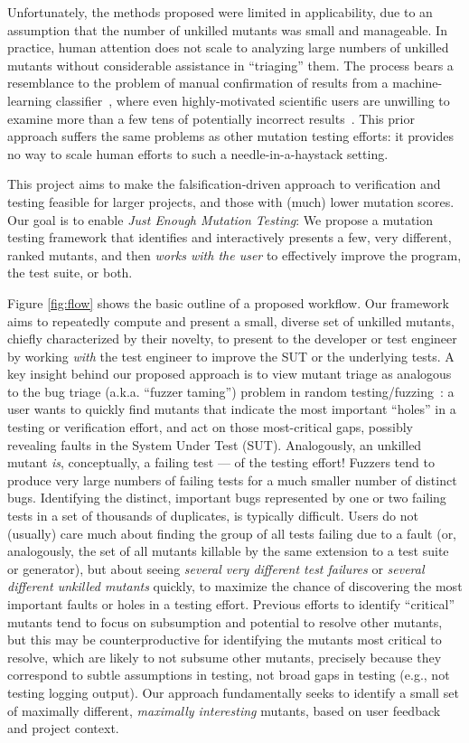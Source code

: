 Unfortunately, the
methods proposed were limited in applicability, due to an
assumption that the number of unkilled mutants was small and manageable.
In practice, human
attention does not scale to analyzing large numbers of
unkilled mutants without considerable assistance in ``triaging'' them.  The process bears a
resemblance to the problem of manual confirmation of results from a
machine-learning classifier~\cite{OnlyOracle,EndUserMistake}, where even highly-motivated scientific
users are unwilling to examine more than a few tens of
potentially incorrect results~\cite{Segal}.
This prior approach suffers the same problems as other
mutation testing efforts: it provides no way to
scale human efforts to such a needle-in-a-haystack setting.

This project aims to make the falsification-driven approach to verification and testing feasible for larger
projects, and those with (much) lower mutation scores.
Our goal is to enable \emph{Just Enough Mutation Testing}: We propose a mutation
testing framework that identifies and interactively presents a few, very
different, ranked mutants, and then \emph{works with the user} to 
effectively improve the program, the test suite, or both.

Figure \ref{fig:flow} shows the basic outline of a proposed workflow.
%
Our framework aims to repeatedly compute and present a small, 
diverse set of unkilled
mutants, chiefly characterized by their novelty, to present to the developer or
test engineer by working
 \emph{with} the test engineer to improve the SUT or
the underlying tests.
A key insight behind our proposed approach is to view mutant triage as
analogous to the bug triage
(a.k.a.  ``fuzzer
taming'') problem in random testing/fuzzing~\cite{PLDI13,distMut,SemCrash,vantonder-ase18}:  a user wants
to quickly find mutants that indicate the most important ``holes'' in a testing
or verification effort, and act on those most-critical gaps, possibly revealing
faults in the System Under Test (SUT).
Analogously, an unkilled mutant \emph{is}, conceptually, a failing test --- of the testing
effort!
Fuzzers tend to produce very large numbers of failing tests for a much
smaller number of distinct bugs. Identifying the distinct, important bugs
represented by one or two failing tests in a set of thousands of duplicates, is typically
difficult. 
Users do not (usually) care much
about finding the group of all tests failing due to a fault (or, analogously, the
set of all mutants killable by the same extension to a test suite or
generator), but about seeing \emph{several very different test failures}
or \emph{several  different unkilled mutants} quickly, to maximize the chance of
discovering the most important faults or holes in a testing effort.
%
Previous efforts to identify ``critical'' mutants tend to focus on
subsumption and potential to resolve other mutants, but this may be
counterproductive for identifying the mutants most critical to
resolve, which are likely to not subsume other mutants, precisely
because they correspond to subtle assumptions in testing, not broad
gaps in testing (e.g., not testing logging output).
Our approach fundamentally seeks to identify a small set of
maximally different, \emph{maximally interesting} mutants,
based on user feedback and project context.

